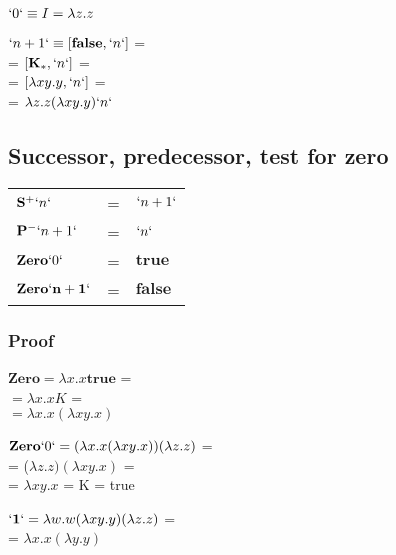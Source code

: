 \documentclass[11pt]{article}
\begin{document}
\begin{center}
$`0` \equiv I = \lambda z.z$
\end{center}


\begin{center}$`n+1` \equiv [\mathbf{false}, `n`]$ = \\
= $[\mathbf{K_*}, `n`] $ = \\
= $ [\lambda xy. y, `n`]$ = \\
= $\lambda z.z (\lambda xy. y) `n`$
\end{center}


\subsection*{Successor, predecessor, test for zero}

\begin{center}\begin{tabular}{l l l}
$\mathbf{S}^+ `n`$ & = & $`n+1`$ \\
$\mathbf{P}^- `n+1`$ & = & $`n`$ \\
$\mathbf{Zero}`0`$ & = & $\mathbf{true}$ \\
$\mathbf{Zero`n+1`}$ & = & $\mathbf{false}$ \\
\end{tabular}\end{center}

\subsubsection*{Proof}

\begin{center}$\mathbf{Zero} = \lambda x.x \mathbf{true}$ = \\
$ = \lambda x.x K$ = \\
$ = \lambda x.x (\lambda xy.x) $\end{center}


\begin{center}$ \mathbf{Zero} `0` = (\lambda x.x (\lambda xy.x)) (\lambda z.z)$ = \\
= ($\lambda z.z) (\lambda xy.x) $ = \\
= $ \lambda xy.x $ = K = true\end{center}

\begin{center}
$\mathbf{`1`} = \lambda w.w (\lambda xy.y)(\lambda z.z)$ = \\
= $\lambda x.x (\lambda y.y)$ 
\end{center}
\end{document}
